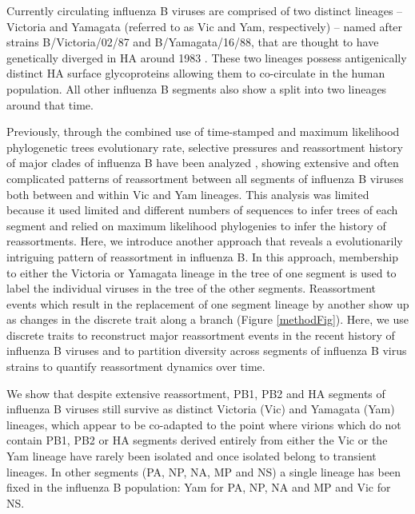\documentclass[11pt,oneside,letterpaper]{article}
\begin{document}
Currently circulating influenza B viruses are comprised of two distinct lineages -- Victoria and Yamagata (referred to as Vic and Yam, respectively) -- named after strains B/Victoria/02/87 and B/Yamagata/16/88, that are thought to have genetically diverged in HA around 1983 \cite{rota1990}. 
These two lineages possess antigenically distinct HA surface glycoproteins allowing them to co-circulate in the human population.
All other influenza B segments also show a split into two lineages around that time.

Previously, through the combined use of time-stamped and maximum likelihood phylogenetic trees evolutionary rate, selective pressures and reassortment history of major clades of influenza B have been analyzed \cite{chen2008}, showing extensive and often complicated patterns of reassortment between all segments of influenza B viruses both between and within Vic and Yam lineages.
This analysis was limited because it used limited and different numbers of sequences to infer trees of each segment and relied on maximum likelihood phylogenies to infer the history of reassortments.
Here, we introduce another approach that reveals a evolutionarily intriguing pattern of reassortment in influenza B.
In this approach, membership to either the Victoria or Yamagata lineage in the tree of one segment is used to label the individual viruses in the tree of the other segments.
Reassortment events which result in the replacement of one segment lineage by another show up as changes in the discrete trait along a branch (Figure \ref{methodFig}).
Here, we use discrete traits to reconstruct major reassortment events in the recent history of influenza B viruses and to partition diversity across segments of influenza B virus strains to quantify reassortment dynamics over time.

We show that despite extensive reassortment, PB1, PB2 and HA segments of influenza B viruses still survive as distinct Victoria (Vic) and Yamagata (Yam) lineages, which appear to be co-adapted to the point where virions which do not contain PB1, PB2 or HA segments derived entirely from either the Vic or the Yam lineage have rarely been isolated and once isolated belong to transient lineages.
In other segments (PA, NP, NA, MP and NS) a single lineage has been fixed in the influenza B population: Yam for PA, NP, NA and MP and Vic for NS.
\end{document}

